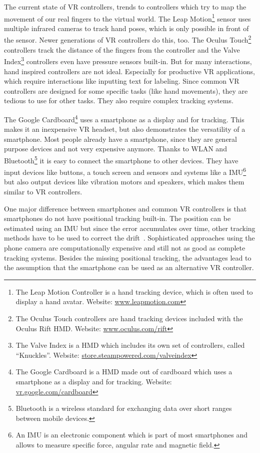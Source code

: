 The current state of \ac{VR} controllers, trends to controllers which try to map the movement of our real fingers to the virtual world. The Leap Motion\footnote{The Leap Motion Controller is a hand tracking device, which is often used to display a hand avatar. Website: \href{https://www.leapmotion.com/}{www.leapmotion.com}} sensor uses multiple infrared cameras to track hand poses, which is only possible in front of the sensor. Newer generations of \ac{VR} controllers do this, too. The Oculus Touch\footnote{The Oculus Touch controllers are hand tracking devices included with the Oculus Rift \ac{HMD}. Website: \href{https://www.oculus.com/rift/}{www.oculus.com/rift}} controllers track the distance of the fingers from the controller and the Valve Index\footnote{The Valve Index is a \ac{HMD} which includes its own set of controllers, called \enquote{Knuckles}. Website: \href{https://store.steampowered.com/valveindex}{store.steampowered.com/valveindex}} controllers even have pressure sensors built-in.
But for many interactions, hand inspired controllers are not ideal. Especially for productive \ac{VR} applications, which require interactions like inputting text for labeling. Since common \ac{VR} controllers are designed for some specific tasks (like hand movements), they are tedious to use for other tasks. They also require complex tracking systems. 

The Google Cardboard\footnote{The Google Cardboard is a \ac{HMD} made out of cardboard which uses a smartphone as a display and for tracking. Website: \href{https://vr.google.com/cardboard/}{vr.google.com/cardboard}} uses a smartphone as a display and for tracking. This makes it an inexpensive \ac{VR} headset, but also demonstrates the versatility of a smartphone. Most people already have a smartphone, since they are general purpose devices and not very expensive anymore. Thanks to \ac{WLAN} and Bluetooth\footnote{Bluetooth is a wireless standard for exchanging data over short ranges between mobile devices.} it is easy to connect the smartphone to other devices. They have input devices like buttons, a touch screen and sensors and systems like a \ac{IMU}\footnote{An IMU is an electronic component which is part of most smartphones and allows to measure specific force, angular rate and magnetic field.} but also output devices like vibration motors and speakers, which makes them similar to \ac{VR} controllers. 

One major difference between smartphones and common \ac{VR} controllers is that smartphones do not have positional tracking built-in. The position can be estimated using an \ac{IMU} but since the error accumulates over time, other tracking methods have to be used to correct the drift~\cite{Zhang.2015}. Sophisticated approaches using the phone camera are computationally expensive and still not as good as complete tracking systems.
Besides the missing positional tracking, the advantages lead to the assumption that the smartphone can be used as an alternative \ac{VR} controller. 


